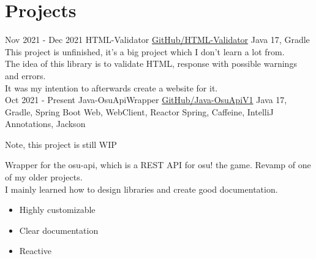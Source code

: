 \documentclass[letterpaper]{twentysecondcv} %
\begin{document}
    \section{Projects}
    \begin{twenty} %
        \twentyitem
        {Nov 2021 -}
        {Dec 2021}
        {HTML-Validator}
        {\href{https://github.com/Tais993/HTML-Validator/}{GitHub/HTML-Validator}}
        {Java 17, Gradle}
        {
            This project is unfinished, it's a big project which I don't learn a lot from.\\

        The idea of this library is to validate HTML, response with possible warnings and errors.\\
        It was my intention to afterwards create a website for it.}\\

        \twentyitem
        {Oct 2021 -}
        {Present}
        {Java-OsuApiWrapper}
        {\href{https://github.com/Tais993/Java-OsuApiV1/}{GitHub/Java-OsuApiV1}}
        {Java 17, Gradle, Spring Boot Web, WebClient, Reactor Spring, Caffeine, IntelliJ Annotations, Jackson}
        {
            Note, this project is still WIP

        Wrapper for the osu-api, which is a REST API for osu! the game.
        Revamp of one of my older projects.\\

        I mainly learned how to design libraries and create good documentation.
            \begin{itemize}
                \item Highly customizable
                \item Clear documentation
                \item Reactive
            \end{itemize}}\\
    \end{twenty}

    \newpage

    \makesidebarSecond %

\end{document}

